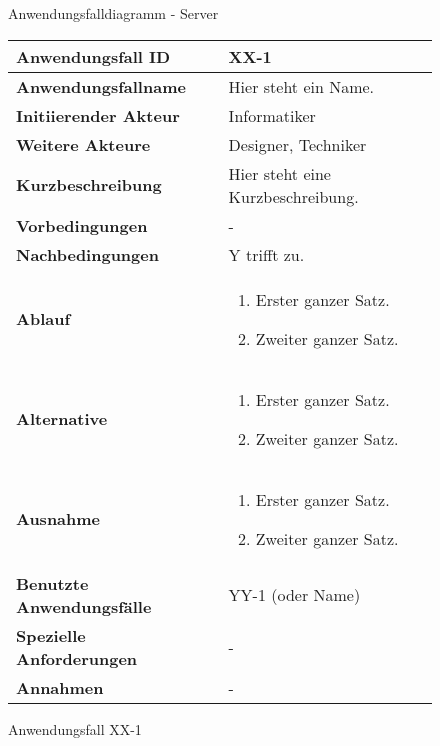 \begin{figure}[h]
	\centering
	\caption{Anwendungsfalldiagramm - Server}
	\label{fig:anwendungsfalldiagramm-server}
\end{figure}

\newpage

\begin{figure}[h]
	\centering
	\begin{tabularx}{\textwidth}{ X | X }
		\textbf{Anwendungsfall ID} & XX-1 \\ \hline
		\textbf{Anwendungsfallname} & Hier steht ein Name. \\ \hline
		\textbf{Initiierender Akteur} & Informatiker \\ \hline
		\textbf{Weitere Akteure} & Designer, Techniker  \\ \hline
		\textbf{Kurzbeschreibung} & Hier steht eine Kurzbeschreibung.  \\ \hline
		\textbf{Vorbedingungen} & -  \\ \hline
		\textbf{Nachbedingungen} & Y trifft zu.  \\ \hline
		\textbf{Ablauf} &
		\begin{enumerate}
			\item Erster ganzer Satz.
			\item Zweiter ganzer Satz.
		\end{enumerate} \\ \hline
		\textbf{Alternative} &
		\begin{enumerate}
			\item Erster ganzer Satz.
			\item Zweiter ganzer Satz.
		\end{enumerate}  \\ \hline
		\textbf{Ausnahme} &
		\begin{enumerate}
			\item Erster ganzer Satz.
			\item Zweiter ganzer Satz.
		\end{enumerate}  \\ \hline
		\textbf{Benutzte Anwendungsfälle} & YY-1 (oder Name) \\ \hline
		\textbf{Spezielle Anforderungen} & - \\ \hline
		\textbf{Annahmen} & -
	\end{tabularx}
	\caption{Anwendungsfall XX-1}
	\label{fig:anwendungsfall-server-tabelle-xx-1}
\end{figure}